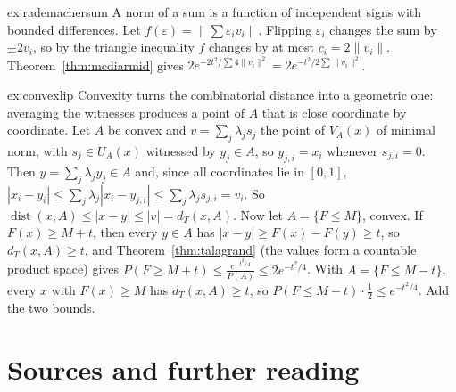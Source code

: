 \begin{solution}{ex:rademachersum}
\idea A norm of a sum is a function of independent signs with bounded differences.
\writeup Let $f(\varepsilon)=\|\sum\varepsilon_iv_i\|$. Flipping $\varepsilon_i$ changes the sum by $\pm2v_i$, so by the triangle inequality $f$ changes by at most $c_i=2\|v_i\|$. Theorem~\ref{thm:mcdiarmid}
gives $2e^{-2t^2/\sum4\|v_i\|^2}=2e^{-t^2/2\sum\|v_i\|^2}$.
\end{solution}

\begin{solution}{ex:convexlip}
\idea Convexity turns the combinatorial distance into a geometric one: averaging the witnesses produces a point of $A$ that is close coordinate by coordinate.
\writeup Let $A$ be convex and $v=\sum_j\lambda_js_j$ the point of $V_A(x)$ of minimal norm, with $s_j\in U_A(x)$ witnessed by $y_j\in A$, so $y_{j,i}=x_i$ whenever $s_{j,i}=0$. Then
$y=\sum_j\lambda_jy_j\in A$ and, since all coordinates lie in $[0,1]$, $|x_i-y_i|\le\sum_j\lambda_j|x_i-y_{j,i}|\le\sum_j\lambda_js_{j,i}=v_i$. So $\operatorname{dist}(x,A)\le|x-y|\le|v|=d_T(x,A)$.
Now let $A=\{F\le M\}$, convex. If $F(x)\ge M+t$, then every $y\in A$ has $|x-y|\ge F(x)-F(y)\ge t$, so $d_T(x,A)\ge t$, and Theorem~\ref{thm:talagrand} (the values form a countable
product space) gives $P(F\ge M+t)\le\frac{e^{-t^2/4}}{P(A)}\le2e^{-t^2/4}$. With $A=\{F\le M-t\}$, every $x$ with $F(x)\ge M$ has $d_T(x,A)\ge t$, so $P(F\le M-t)\cdot\frac12\le e^{-t^2/4}$. Add the two bounds.
\end{solution}

\section*{Sources and further reading}

